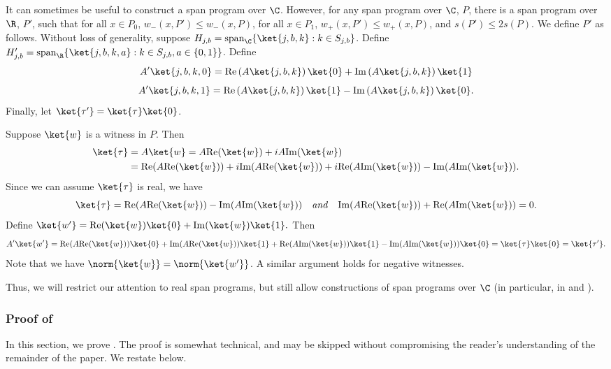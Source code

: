 \documentclass{toc}
\begin{document}
\begin{remark}\label{rem:real}
It can sometimes be useful to construct a span program over $\C$. 
However, for any span program over $\C$, $P$, there is a span program over $\R$, $P'$, such that for all $x\in P_0$, $w_-(x,P')\leq w_-(x,P)$, for all $x\in P_1$, $w_+(x,P')\leq w_+(x,P)$, and $s(P')\leq 2s(P)$. We define $P'$ as follows. Without loss of generality, suppose $H_{j,b}=\mathrm{span}_{\C}\{\ket{j,b,k}:k\in S_{j,b}\}$. Define $H'_{j,b}=\mathrm{span}_{\R}\{\ket{j,b,k,a}:k\in S_{j,b},a\in\{0,1\}\}$. Define
$$A'\ket{j,b,k,0} = \mathrm{Re}\left(A\ket{j,b,k}\right)\ket{0}+\mathrm{Im}\left(A\ket{j,b,k}\right)\ket{1}$$
$$A'\ket{j,b,k,1} = \mathrm{Re}\left(A\ket{j,b,k}\right)\ket{1} - \mathrm{Im}\left(A\ket{j,b,k}\right)\ket{0}.$$
Finally, let $\ket{\tau'}=\ket{\tau}\ket{0}$. 

Suppose $\ket{w}$ is a witness in $P$. Then
\begin{align*}
\ket{\tau} &= A\ket{w}=A\mathrm{Re}(\ket{w})+iA\mathrm{Im}(\ket{w})\\ 
&= \mathrm{Re}(A\mathrm{Re}(\ket{w}))+i\mathrm{Im}(A\mathrm{Re}(\ket{w}))+i\mathrm{Re}(A\mathrm{Im}(\ket{w})) - \mathrm{Im}(A\mathrm{Im}(\ket{w})).
\end{align*}
Since we can assume $\ket{\tau}$ is real, we have
$$\ket{\tau}=\mathrm{Re}(A\mathrm{Re}(\ket{w})) - \mathrm{Im}(A\mathrm{Im}(\ket{w}))\quad\mbox{\emph{and}}\quad
\mathrm{Im}(A\mathrm{Re}(\ket{w}))+\mathrm{Re}(A\mathrm{Im}(\ket{w})) = 0.$$
Define
$\ket{w'} = \mathrm{Re}(\ket{w})\ket{0}+\mathrm{Im}(\ket{w})\ket{1}.$
Then
$$A'\ket{w'} = \mathrm{Re}(A\mathrm{Re}(\ket{w}))\ket{0}+\mathrm{Im}(A\mathrm{Re}(\ket{w}))\ket{1} + \mathrm{Re}(A\mathrm{Im}(\ket{w}))\ket{1} - \mathrm{Im}(A\mathrm{Im}(\ket{w}))\ket{0}=\ket{\tau}\ket{0}=\ket{\tau'}.$$
Note that we have $\norm{\ket{w}}=\norm{\ket{w'}}$. 
A similar argument holds for negative witnesses. 

Thus, we will restrict our attention to real span programs, but still allow constructions of span programs over $\C$ (in particular, in  and ).
\end{remark}

%

\subsubsection{Proof of }\label{sec:kappa}

%
%
In this section, we prove . The proof is somewhat technical, and may be skipped without compromising the reader's understanding of the remainder of the paper. We restate  below. %
\end{document}

